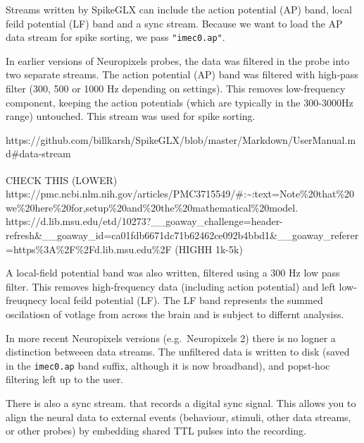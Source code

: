 \documentclass[
  letterpaper,
  DIV=11,
  numbers=noendperiod]{scrreprt}
\begin{document}
Streams written by SpikeGLX can include the action potential (AP) band,
local feild potential (LF) band and a sync stream. Because we want to
load the AP data stream for spike sorting, we pass \texttt{"imec0.ap"}.

\begin{tcolorbox}[enhanced jigsaw, arc=.35mm, bottomrule=.15mm, bottomtitle=1mm, breakable, colback=white, colbacktitle=quarto-callout-note-color!10!white, colframe=quarto-callout-note-color-frame, coltitle=black, left=2mm, leftrule=.75mm, opacityback=0, opacitybacktitle=0.6, rightrule=.15mm, title=\textcolor{quarto-callout-note-color}{\faInfo}\hspace{0.5em}{Details on SpikeGLX streams}, titlerule=0mm, toprule=.15mm, toptitle=1mm]

In earlier versions of Neuropixels probes, the data was filtered in the
probe into two separate streams. The action potential (AP) band was
filtered with high-pass filter (300, 500 or 1000 Hz depending on
settings). This removes low-frequency component, keeping the action
potentials (which are typically in the 300-3000Hz range) untouched. This
stream was used for spike sorting.

https://github.com/billkarsh/SpikeGLX/blob/master/Markdown/UserManual.md\#data-stream

\textsuperscript{}CHECK THIS (LOWER)
https://pmc.ncbi.nlm.nih.gov/articles/PMC3715549/\#:\textasciitilde:text=Note\%20that\%20we\%20here\%20for,setup\%20and\%20the\%20mathematical\%20model.
https://d.lib.msu.edu/etd/10273?\_\_goaway\_challenge=header-refresh\&\_\_goaway\_id=ca01fdb6671dc71b62462ce092b4bbd1\&\_\_goaway\_referer=https\%3A\%2F\%2Fd.lib.msu.edu\%2F
(HIGHH 1k-5k)

A local-field potential band was also written, filtered using a 300 Hz
low pass filter. This removes high-frequency data (including action
potential) and left low-freuqnecy local feild potential (LF). The LF
band represents the summed oscilatiosn of votlage from across the brain
and is subject to differnt analysiss.

In more recent Neuropixels versions (e.g.~Neuropixels 2) there is no
logner a distinction betweeen data streams. The unfiltered data is
written to disk (saved in the \texttt{imec0.ap} band suffix, although it
is now broadband), and popst-hoc filtering left up to the user.

There is also a sync stream. that records a digital sync signal. This
allows you to align the neural data to external events (behaviour,
stimuli, other data streams, or other probes) by embedding shared TTL
pulses into the recording.

\end{tcolorbox}
\end{document}
